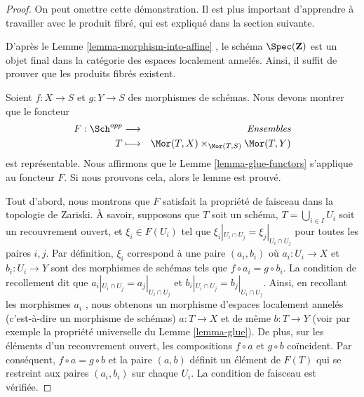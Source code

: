 \begin{proof}
On peut omettre cette démonstration. Il est plus important d'apprendre à
travailler avec le produit fibré, qui est expliqué dans la section suivante.

\medskip\noindent
D'après le Lemme  \ref{lemma-morphism-into-affine} , le schéma  $\Spec(\mathbf{Z})$  est un objet final dans la
catégorie des espaces localement annelés. Ainsi, il suffit de prouver que les
produits fibrés existent.

\medskip\noindent
Soient  $f : X \to S$  et  $g : Y \to S$  des morphismes de schémas. Nous devons montrer
que le foncteur
\begin{eqnarray*}
F : \Sch^{opp} & \longrightarrow & \textit{Ensembles} \\
T & \longmapsto &
\Mor(T, X) \times_{\Mor(T, S)} \Mor(T, Y)
\end{eqnarray*}
est représentable. Nous affirmons que le Lemme  \ref{lemma-glue-functors}  s'applique au foncteur
 $F$. Si nous prouvons cela, alors le lemme est prouvé.

\medskip\noindent
Tout d'abord, nous montrons que  $F$  satisfait la propriété de faisceau
dans la topologie de Zariski. À savoir, supposons que  $T$  soit un schéma,
 $T = \bigcup_{i \in I} U_i$  soit un recouvrement ouvert, et  $\xi_i \in F(U_i)$  tel que  $\xi_i|_{U_i \cap U_j} =  \xi_j|_{U_i \cap U_j}$ 
pour toutes les paires  $i, j$. Par définition,  $\xi_i$  correspond à une
paire  $(a_i, b_i)$  où  $a_i : U_i \to X$  et  $b_i : U_i \to Y$  sont des morphismes de schémas
tels que  $f \circ a_i = g \circ b_i$. La condition de recollement dit que  $a_i|_{U_i \cap U_j} =  a_j|_{U_i \cap U_j}$  et
 $b_i|_{U_i \cap U_j} =  b_j|_{U_i \cap U_j}$. Ainsi, en recollant les morphismes  $a_i$ , nous obtenons un
morphisme d'espaces localement annelés (c'est-à-dire un morphisme de schémas)
 $a : T \to X$  et de même  $b : T \to Y$  (voir par exemple la propriété universelle du
Lemme  \ref{lemma-glue}). De plus, sur les éléments d'un recouvrement ouvert, les
compositions  $f \circ a$  et  $g \circ b$  coïncident. Par conséquent,  $f \circ a = g \circ b$ 
et la paire  $(a, b)$  définit un élément de  $F(T)$  qui se restreint
aux paires  $(a_i, b_i)$  sur chaque  $U_i$. La condition de faisceau est
vérifiée.


\end{proof}

